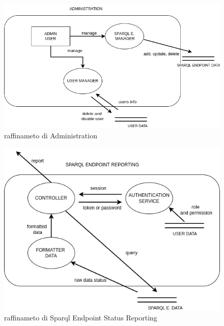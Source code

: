 \documentclass{article}
\begin{document}
\begin{figure}[h]
    \centering
    \includegraphics[width=1\textwidth]{dfd2.png}
    \caption{raffinameto di Administration}
\end{figure}

\begin{figure}[h]
    \centering
    \includegraphics[width=1\textwidth]{dfd3.png}
    \caption{raffinameto di Sparql Endpoint Status Reporting}
\end{figure}
\end{document}
